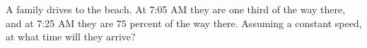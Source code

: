 A family drives to the beach. At 7:05 AM they are one third of the way there, and at 7:25 AM they are $75$ percent of the way there. Assuming a constant speed, at what time will they arrive?

